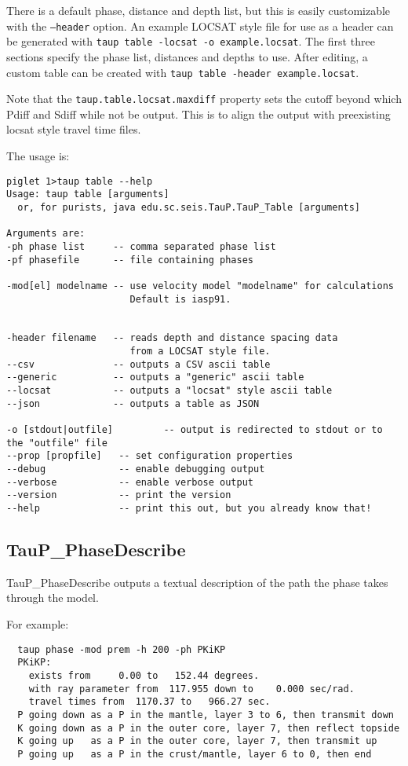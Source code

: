 There is a default phase, distance and depth list, but this is easily
customizable with the \texttt{--header} option. An example LOCSAT style
file for use as a header can be generated with
\texttt{taup table -locsat -o example.locsat}. The first
three sections specify the phase list, distances and depths to use.
After editing, a custom table can be created with
\texttt{taup table -header example.locsat}.

Note that the \texttt{taup.table.locsat.maxdiff} property sets the cutoff beyond which
Pdiff and Sdiff while not be output. This is to align the output with preexisting
locsat style travel time files.

The usage is:
\begin{verbatim}
piglet 1>taup table --help
Usage: taup table [arguments]
  or, for purists, java edu.sc.seis.TauP.TauP_Table [arguments]

Arguments are:
-ph phase list     -- comma separated phase list
-pf phasefile      -- file containing phases

-mod[el] modelname -- use velocity model "modelname" for calculations
                      Default is iasp91.


-header filename   -- reads depth and distance spacing data
                      from a LOCSAT style file.
--csv              -- outputs a CSV ascii table
--generic          -- outputs a "generic" ascii table
--locsat           -- outputs a "locsat" style ascii table
--json             -- outputs a table as JSON

-o [stdout|outfile]         -- output is redirected to stdout or to the "outfile" file
--prop [propfile]   -- set configuration properties
--debug             -- enable debugging output
--verbose           -- enable verbose output
--version           -- print the version
--help              -- print this out, but you already know that!
\end{verbatim}

\subsection{TauP\_PhaseDescribe}

TauP\_PhaseDescribe outputs a textual description of the path the
phase takes through the model.

For example:
\begin{verbatim}
  taup phase -mod prem -h 200 -ph PKiKP
  PKiKP:
    exists from     0.00 to   152.44 degrees.
    with ray parameter from  117.955 down to    0.000 sec/rad.
    travel times from  1170.37 to   966.27 sec.
  P going down as a P in the mantle, layer 3 to 6, then transmit down
  K going down as a P in the outer core, layer 7, then reflect topside
  K going up   as a P in the outer core, layer 7, then transmit up
  P going up   as a P in the crust/mantle, layer 6 to 0, then end
\end{verbatim}

